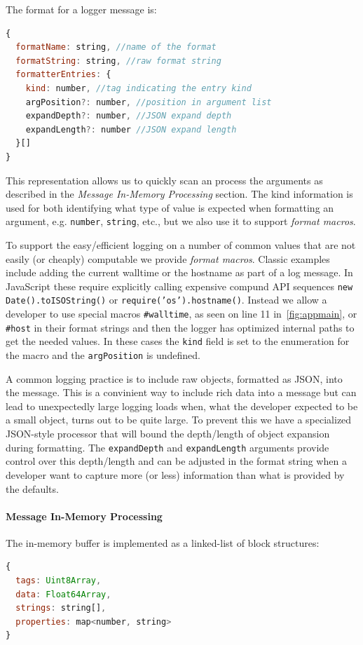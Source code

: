 The format for a logger message is:
\begin{lstlisting}[language=JavaScript,basicstyle=\scriptsize]
{
  formatName: string, //name of the format
  formatString: string, //raw format string
  formatterEntries: {
    kind: number, //tag indicating the entry kind
    argPosition?: number, //position in argument list
    expandDepth?: number, //JSON expand depth
    expandLength?: number //JSON expand length
  }[]
}
\end{lstlisting}

This representation allows us to quickly scan an process the arguments as 
described in the \emph{Message In-Memory Processing} section. The kind 
information is used for both identifying what type of value is expected 
when formatting an argument, e.g. \texttt{number}, \texttt{string}, etc., 
but we also use it to support \emph{format macros}.

To support the easy/efficient logging on a number of common values that 
are not easily (or cheaply) computable we provide \emph{format macros}. 
Classic examples include adding the current walltime or the hostname as 
part of a log message. In JavaScript these require explicitly calling 
expensive compund API sequences \texttt{new Date().toISOString()} or 
\texttt{require('os').hostname()}. Instead we allow a developer to use 
special macros \texttt{\#walltime}, as seen on line 11 in~\autoref{fig:appmain}, 
or \texttt{\#host} in their format 
strings and then the logger has optimized internal paths to get the needed 
values. In these cases the \texttt{kind} field is set to the enumeration 
for the macro and the \texttt{argPosition} is undefined.

A common logging practice is to include raw objects, formatted as JSON, into the 
message. This is a convinient way to include rich data into a message but can 
lead to unexpectedly large logging loads when, what the developer expected to 
be a small object, turns out to be quite large. To prevent this we have a specialized 
JSON-style processor that will bound the depth/length of object expansion during 
formatting. The \texttt{expandDepth} and \texttt{expandLength} arguments provide 
control over this depth/length and can be adjusted in the format string when a 
developer want to capture more (or less) information than what is provided by the 
defaults.

\paragraph{Message In-Memory Processing}
\noindent
The in-memory buffer is implemented as a linked-list of block structures:
\begin{lstlisting}[language=JavaScript,basicstyle=\scriptsize]
{
  tags: Uint8Array,
  data: Float64Array,
  strings: string[],
  properties: map<number, string>
}
\end{lstlisting}

